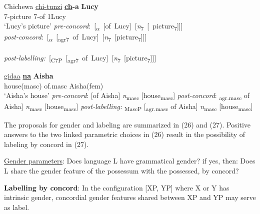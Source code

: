 \documentclass[output=paper
,modfonts
,nonflat]{langsci/langscibook}
\begin{document}
\begin{exe} \settowidth{}
	\ex 
	\xlist
	\ex Chichewa \newline
	\gll \underline{chi-tunzi}    \textbf{\underline{ch}-a}  \textbf{Lucy} \\
	7-picture    7-of     1Lucy\\
	\glt `Lucy’s picture'  	
	\ex \mbox{\textit{pre-concord}:   [\textsubscript{$\alpha$} [of Lucy] [\textit{n}\textsubscript{7} [ picture\textsubscript{7}]]]}\\  
	\ex \mbox{\textit{post-concord}:   [\textsubscript{$\alpha$} [\textsubscript{agr7} of Lucy] [\textit{n}\textsubscript{7} [picture\textsubscript{7}]]]}\\  \\
	\ex \mbox{\textit{post-labelling:} [\textsubscript{C7P} [\textsubscript{agr7} of Lucy] [\textit{n}\textsubscript{7} [picture\textsubscript{7}]]]}\\ 
	\endxlist
\end{exe}
\begin{exe}
	\ex 
	\xlist
	\ex 
	\gll \underline{gidaa}    \textbf{\underline{na}}  \textbf{Aisha} \\
	house(masc)   of.masc   Aisha(fem)\\
	\glt `Aisha's house'  	
	\ex \textit{pre-concord}:   {\lbrack}[of Aisha] \textit{n}\textsubscript{masc} [house\textsubscript{masc}]{\rbrack}
	\ex \textit{post-concord}:   {\lbrack}\textsubscript{agr.masc} of Aisha] \textit{n}\textsubscript{masc} [house\textsubscript{masc}]{\rbrack}
	\ex \textit{post-labelling:} {\lbrack}\textsubscript{MascP} [\textsubscript{agr.masc} of Aisha] \textit{n}\textsubscript{masc} [house\textsubscript{masc}]{\rbrack}
	\endxlist
\end{exe}
The proposals for gender and labeling are summarized in (26) and (27). Positive answers to the two linked parametric choices in (26) result in the possibility of labeling by concord in (27). 

\begin{exe}
\ex \underline{Gender parameters}:
\xlist
\ex Does language L have grammatical gender? if yes, then:                   
\ex Does L share the gender feature of the possessum with the possessed, by concord?
\endxlist
\end{exe}
\begin{exe}
\ex 
\textbf{Labelling by concord}: In the configuration [XP, YP] where X or Y has intrinsic gender, concordial gender features shared between XP and YP may serve as label.
\end{exe}
\end{document}
